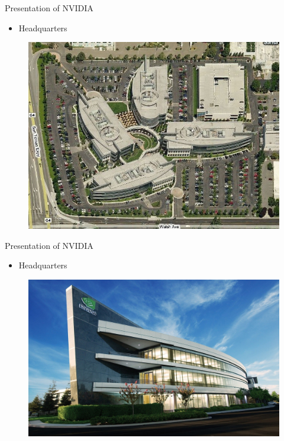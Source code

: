 \documentclass{beamer}
\begin{document}
\begin{frame}{Presentation of NVIDIA}
	\transdissolve[duration=0.08]
	\begin{itemize}
		\item<+->{Headquarters}
	\end{itemize}
	\begin{figure}[h]
		\includegraphics[width=1.00\textheight]{images/nvidia_locaux.jpg}
	\end{figure}
\end{frame}

\begin{frame}{Presentation of NVIDIA}
	\transdissolve[duration=0.08]
	\begin{itemize}
		\item<+->{Headquarters}
	\end{itemize}
	\begin{figure}[h]
		\includegraphics[width=1.00\textheight]{images/NVIDIA_HEADQUARTERS.jpg}
	\end{figure}
\end{frame}
\end{document}
